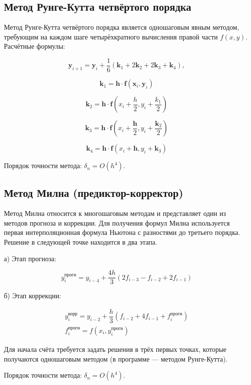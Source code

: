 \subsection{Метод Рунге-Кутта четвёртого порядка}

Метод Рунге-Кутта четвёртого порядка является одношаговым явным методом, требующим на каждом шаге четырёхкратного вычисления правой части $f(x, y)$. Расчётные формулы:

\[
\mathbf{y}_{i+1} = \mathbf{y}_i + \frac{1}{6}(\mathbf{k}_1 + 2\mathbf{k}_2 + 2\mathbf{k}_3 + \mathbf{k}_4),
\]

\[
\mathbf{k}_1 = \mathbf{h} \cdot \mathbf{f}(\mathbf{x}_i, \mathbf{y}_i)
\]

\[
\mathbf{k}_2 = \mathbf{h} \cdot \mathbf{f}\left(x_i + \frac{h}{2}, y_i + \frac{k_1}{2}\right)
\]

\[
\mathbf{k}_3 = \mathbf{h} \cdot \mathbf{f}\left(x_i + \frac{\mathbf{h}}{2}, y_i + \frac{\mathbf{k}_2}{2}\right)
\]

\[
\mathbf{k}_4 = \mathbf{h} \cdot \mathbf{f}(x_i + \mathbf{h}, y_i + \mathbf{k}_3)
\]

Порядок точности метода: $\delta_n = O(h^4)$.

\subsection{Метод Милна (предиктор-корректор)}

Метод Милна относится к многошаговым методам и представляет один из методов прогноза и коррекции. Для получения формул Милна используется первая интерполяционная формула Ньютона с разностями до третьего порядка. Решение в следующей точке находится в два этапа.

а) Этап прогноза:

\[
y_i^{\text{прогн}} = y_{i-4} + \frac{4h}{3}(2f_{i-3} - f_{i-2} + 2f_{i-1})
\]

б) Этап коррекции:

\[
\begin{array}{l}
y_i^{\text{корр}} = y_{i-2} + \dfrac{h}{3}(f_{i-2} + 4f_{i-1} + f_i^{\text{прогн}}) \\[6pt]
f_i^{\text{прогн}} = f(x_i, y_i^{\text{прогн}})
\end{array}
\]

Для начала счёта требуется задать решения в трёх первых точках, которые получаются одношаговым методом (в программе — методом Рунге-Кутта).

Порядок точности метода: $\delta_n = O(h^4)$.

